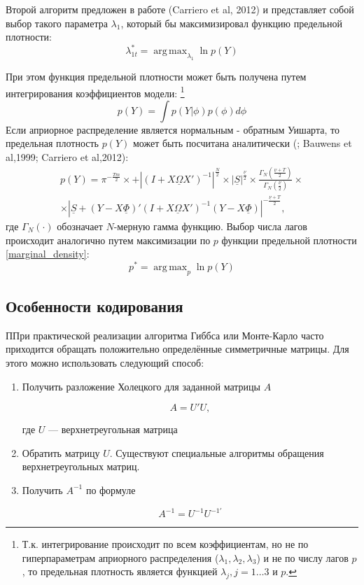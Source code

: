 \documentclass[11pt]{article} %
\DeclareMathOperator*{\argmax}{arg\,max}
\newcommand{\prior}{\underline}
\begin{document}
Второй алгоритм предложен в работе (Carriero et al, 2012) и представляет собой выбор такого параметра $\lambda_1$, который бы максимизировал функцию предельной плотности:
\begin{equation}
\lambda_{1t}^*=\argmax_{\lambda_1} \ln p(Y)
\end{equation}

При этом функция предельной плотности может быть получена путем интегрирования коэффициентов модели: \footnote{Т.к. интегрирование происходит по  всем коэффициентам, но не по гиперпараметрам априорного распределения ($\lambda_1,\lambda_2,\lambda_3$)  и не по числу лагов $p$, то предельная плотность является функцией $\lambda_j,j=1\ldots 3$ и $p$.}
\begin{equation}
p(Y)=\int p(Y|\phi)p(\phi) d \phi
\end{equation}
Если априорное распределение является нормальным - обратным Уишарта, то предельная плотность $p(Y)$ может быть посчитана аналитически (\cite{zellner_1996_introduction}; Bauwens et al,1999; Carriero et al,2012):
\begin{multline}
p(Y)=\pi^{-\frac{Tm}{2}}\times +\left |(I+X\prior{\Omega} X')^{-1}\right|^{\frac{N}{2}}\times |\prior{S}|^{\frac{\prior{\nu}}{2}}\times \frac{\Gamma_N(\frac{\prior{\nu}+T}{2})}{\Gamma_N(\frac{\prior{\nu}}{2})}\times \\ \times
\left|\prior{S}+(Y-X\prior{\Phi})'(I+X\prior{\Omega} X')^{-1}(Y-X\prior{\Phi})\right|^{-\frac{\prior{\nu}+T}{2}},\label{marginal_density}
\end{multline}
где $\Gamma_N(\cdot)$ обозначает $N$-мерную гамма функцию.
Выбор числа лагов происходит аналогично путем максимизации по $p$ функции предельной плотности \eqref{marginal_density}: 
\begin{equation}
p^*=\argmax_{p} \ln p(Y)
\end{equation} 


\subsection{Особенности кодирования}

ППри практической реализации алгоритма Гиббса или Монте-Карло часто
приходится обращать положительно определённые симметричные матрицы.
Для этого можно использовать следующий способ:


\begin{enumerate}

\item Получить разложение Холецкого для заданной матрицы $A$

\[
A=U'U,
\]

где $U$ --- верхнетреугольная матрица

\item Обратить матрицу $U$. Существуют специальные алгоритмы обращения
верхнетреугольных матриц.

\item Получить $A^{-1}$ по формуле

\[
A^{-1}=U^{-1}U^{-1\prime}
\]

\end{enumerate}
\end{document}

